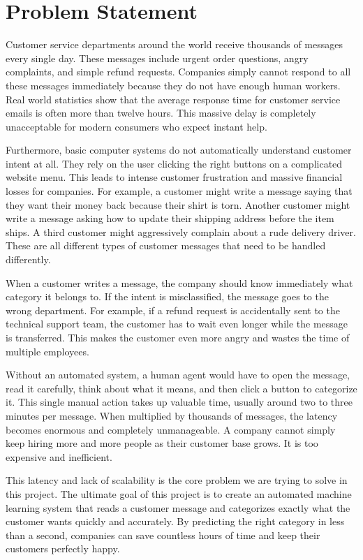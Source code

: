 \documentclass[12pt]{article}
\begin{document}
\section{Problem Statement}
Customer service departments around the world receive thousands of messages every single day. These messages include urgent order questions, angry complaints, and simple refund requests. Companies simply cannot respond to all these messages immediately because they do not have enough human workers. Real world statistics show that the average response time for customer service emails is often more than twelve hours. This massive delay is completely unacceptable for modern consumers who expect instant help. 

Furthermore, basic computer systems do not automatically understand customer intent at all. They rely on the user clicking the right buttons on a complicated website menu. This leads to intense customer frustration and massive financial losses for companies. For example, a customer might write a message saying that they want their money back because their shirt is torn. Another customer might write a message asking how to update their shipping address before the item ships. A third customer might aggressively complain about a rude delivery driver. These are all different types of customer messages that need to be handled differently. 

When a customer writes a message, the company should know immediately what category it belongs to. If the intent is misclassified, the message goes to the wrong department. For example, if a refund request is accidentally sent to the technical support team, the customer has to wait even longer while the message is transferred. This makes the customer even more angry and wastes the time of multiple employees. 

Without an automated system, a human agent would have to open the message, read it carefully, think about what it means, and then click a button to categorize it. This single manual action takes up valuable time, usually around two to three minutes per message. When multiplied by thousands of messages, the latency becomes enormous and completely unmanageable. A company cannot simply keep hiring more and more people as their customer base grows. It is too expensive and inefficient. 

This latency and lack of scalability is the core problem we are trying to solve in this project. The ultimate goal of this project is to create an automated machine learning system that reads a customer message and categorizes exactly what the customer wants quickly and accurately. By predicting the right category in less than a second, companies can save countless hours of time and keep their customers perfectly happy.
\end{document}
